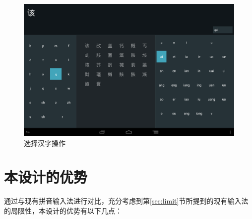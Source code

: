   \begin{figure}[h]
  \noindent\includegraphics[width=150mm]{img/layout1_finished}
  \caption{选择汉字操作}
  \label{fig:layout1_finished}
  \end{figure}

  \section{本设计的优势}

  通过与现有拼音输入法进行对比，充分考虑到第\ref{sec:limit}节所提到的现有输入法的局限性，本设计的优势有以下几点：

